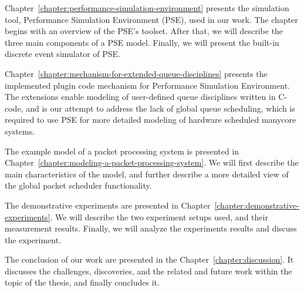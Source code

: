 Chapter~\ref{chapter:performance-simulation-environment} presents the simulation tool, Performance Simulation Environment (PSE), used in our work. The chapter begins with an overview of the PSE's toolset. After that, we will describe the three main components of a PSE model. Finally, we will present the built-in discrete event simulator of PSE.

Chapter~\ref{chapter:mechanism-for-extended-queue-disciplines} presents the implemented plugin code mechanism for Performance Simulation Environment. The extensions enable modeling of user-defined queue disciplines written in C-code, and is our attempt to address the lack of global queue scheduling, which is required to use PSE for more detailed modeling of hardware scheduled manycore systems.

The example model of a packet processing system is presented in Chapter~\ref{chapter:modeling-a-packet-processing-system}. We will first describe the main characteristics of the model, and further describe a more detailed view of the global packet scheduler functionality.

The demonstrative experiments are presented in Chapter~\ref{chapter:demonstrative-experiments}. We will describe the two experiment setups used, and their measurement results. Finally, we will analyze the experiments results and discuss the experiment.

The conclusion of our work are presented in the Chapter~\ref{chapter:discussion}. It discusses the challenges, discoveries, and the related and future work within the topic of the thesis, and finally concludes it.

